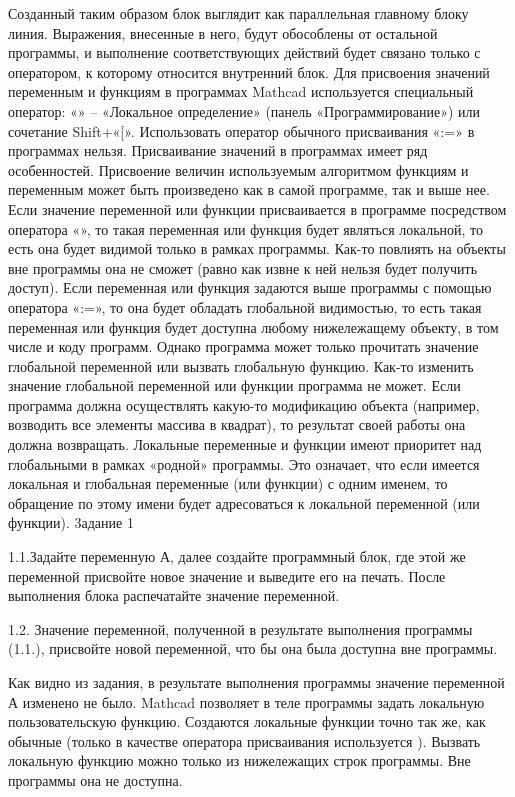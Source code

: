 Созданный таким образом блок выглядит как параллельная главному блоку линия. Выражения, внесенные в него, будут обособлены от остальной программы, и выполнение соответствующих действий будет связано только с оператором, к которому относится внутренний блок.
Для присвоения значений переменным и функциям в программах Mathcad используется специальный оператор: «» – «Локальное определение» (панель «Программирование») или сочетание Shift+«[». Использовать оператор обычного присваивания «:=» в программах нельзя.
Присваивание значений в программах имеет ряд особенностей. Присвоение величин используемым алгоритмом функциям и переменным может быть произведено как в самой программе, так и выше нее. Если значение переменной или функции присваивается в программе посредством оператора «», то такая переменная или функция будет являться локальной, то есть она будет видимой только в рамках программы. Как-то повлиять на объекты вне программы она не сможет (равно как извне к ней нельзя будет получить доступ). Если переменная или функция задаются выше программы с помощью оператора «:=», то она будет обладать глобальной видимостью, то есть такая переменная или функция будет доступна любому нижележащему объекту, в том числе и коду программ. Однако программа может только прочитать значение глобальной переменной или вызвать глобальную функцию. Как-то изменить значение глобальной переменной или функции программа не может. Если программа должна осуществлять какую-то модификацию объекта (например, возводить все элементы массива в квадрат), то результат своей работы она должна возвращать.
Локальные переменные и функции имеют приоритет над глобальными в рамках «родной» программы. Это означает, что если имеется локальная и глобальная переменные (или функции) с одним именем, то обращение по этому имени будет адресоваться к локальной переменной (или функции).
3адание 1

1.1.Задайте переменную А, далее создайте программный блок, где этой же переменной присвойте новое значение и выведите его на печать. После выполнения блока распечатайте значение переменной.



1.2. Значение переменной, полученной в результате выполнения программы (1.1.), присвойте новой переменной, что бы она была доступна вне программы. 



Как видно из задания, в результате выполнения программы значение переменной А изменено не было.
Mathcad позволяет в теле программы задать локальную пользовательскую функцию. Создаются локальные функции точно так же, как обычные (только в качестве оператора присваивания используется ). Вызвать локальную функцию можно только из нижележащих строк программы. Вне программы она не доступна.

